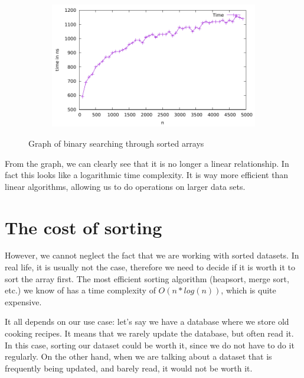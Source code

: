\documentclass[a4paper,11pt]{article}
\begin{document}
    \begin{figure}[h]
        \centering
        \begin{subfigure}[b]{.5\textwidth}
            \centering
            \includegraphics[width=\textwidth]{./binary_search/data} %
        \end{subfigure}
        \caption{Graph of binary searching through sorted arrays}
        \label{fig:graph_3}
    \end{figure}
    From the graph, we can clearly see that it is no longer a linear relationship.
    In fact this looks like a logarithmic time complexity.
    It is way more efficient than linear algorithms, allowing us to do operations on larger data sets.

    \section*{The cost of sorting}

    However, we cannot neglect the fact that we are working with sorted datasets.
    In real life, it is usually not the case, therefore we need to decide if it is worth it to sort the array first.
    The most efficient sorting algorithm (heapsort, merge sort, etc.) we know of has a time complexity of $O(n*log(n))$, which is quite expensive.

    It all depends on our use case: let's say we have a database where we store old cooking recipes.
    It means that we rarely update the database, but often read it.
    In this case, sorting our dataset could be worth it, since we do not have to do it regularly.
    On the other hand, when we are talking about a dataset that is frequently being updated, and barely read, it would not be worth it.
\end{document}
